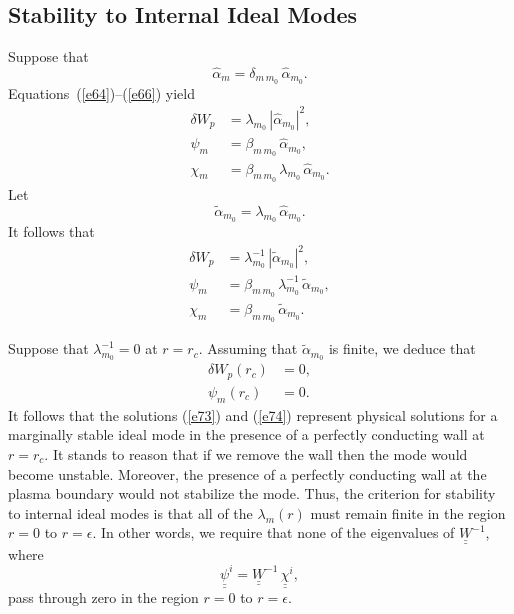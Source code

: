 \documentclass[12pt,prb,aps,notitlepage]{revtex4-1}
\begin{document}
\subsection{Stability to Internal Ideal Modes}
Suppose that
\begin{equation}
\hat{\alpha}_m = \delta_{m\,m_0}\,\hat{\alpha}_{m_0}.
\end{equation}
Equations~(\ref{e64})--(\ref{e66}) yield
\begin{align}
\delta W_p &= \lambda_{m_0}\,|\hat{\alpha}_{m_0}|^2,\\[0.5ex]
\psi_m &= \beta_{m\,m_0}\,\hat{\alpha}_{m_0},\label{e73}\\[0.5ex]
\chi_m &=  \beta_{m\,m_0}\,\lambda_{m_0}\,\hat{\alpha}_{m_0}.\label{e74}
\end{align}
Let 
\begin{equation}
\tilde{\alpha}_{m_0} = \lambda_{m_0}\,\hat{\alpha}_{m_0}.
\end{equation}
It follows that 
\begin{align}
\delta W_p&= \lambda_{m_0}^{-1}\,|\tilde{\alpha}_{m_0}|^2,\\[0.5ex]
\psi_m &= \beta_{m\,m_0}\,\lambda_{m_0}^{-1}\,\tilde{\alpha}_{m_0},\\[0.5ex]
\chi_m&=  \beta_{m\,m_0}\,\tilde{\alpha}_{m_0}.
\end{align}

Suppose that $\lambda_{m_0}^{-1}=0$ at $r=r_c$. Assuming that $\tilde{\alpha}_{m_0}$ is finite, we deduce that
\begin{align}
\delta W_p(r_c) &=0,\\[0.5ex]
\psi_m(r_c) &= 0.
\end{align}
It follows that the solutions (\ref{e73}) and (\ref{e74}) represent physical solutions for a marginally stable ideal mode in the presence of a
perfectly conducting wall at $r=r_c$. It stands to reason that if we remove the wall then the mode would become unstable. Moreover, the
presence of a perfectly conducting wall at the plasma boundary would not stabilize the mode. Thus, the criterion for stability to internal ideal
modes is that all of the $\lambda_m(r)$ must remain finite in the region $r=0$ to $r=\epsilon$. In other words, we require that none of the
eigenvalues of $\underline{\underline{W}}^{-1}$, where 
\begin{equation}
\underline{\underline{\psi}}^i = \underline{\underline{W}}^{-1}\,\underline{\underline{\chi}}^i,
\end{equation}
pass through zero in the region $r=0$ to $r=\epsilon$. 
\end{document}
